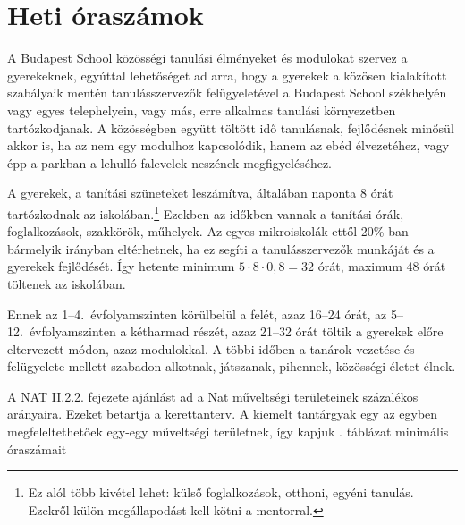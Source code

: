 \section{Heti óraszámok}

A Budapest School közösségi tanulási élményeket és modulokat szervez a gyerekeknek, egyúttal lehetőséget ad arra, hogy a gyerekek a közösen kialakított szabályaik mentén tanulásszervezők felügyeletével a Budapest School székhelyén vagy egyes telephelyein, vagy más, erre alkalmas tanulási környezetben tartózkodjanak. A közösségben együtt töltött idő tanulásnak, fejlődésnek minősül akkor is, ha az nem egy modulhoz kapcsolódik, hanem az ebéd élvezetéhez, vagy épp a parkban a lehulló falevelek neszének megfigyeléséhez.

A gyerekek, a tanítási szüneteket leszámítva, általában naponta 8 órát tartózkodnak az iskolában.\footnote{Ez alól több kivétel lehet: külső foglalkozások, otthoni, egyéni tanulás. Ezekről külön megállapodást kell kötni a mentorral.} Ezekben az időkben vannak a tanítási órák, foglalkozások, szakkörök, műhelyek. Az egyes mikroiskolák ettől 20\%-ban bármelyik irányban eltérhetnek, ha ez segíti a tanulásszervezők munkáját és a gyerekek fejlődését. Így hetente minimum $5 \cdot 8 \cdot 0,8 = 32$ órát, maximum $48$ órát töltenek az iskolában.

Ennek az 1--4.~évfolyamszinten körülbelül a felét, azaz 16--24 órát, az 5--12.~évfolyamszinten a  kétharmad részét, azaz 21--32 órát töltik a gyerekek előre eltervezett módon, azaz modulokkal. A többi időben a tanárok vezetése és felügyelete mellett szabadon alkotnak, játszanak, pihennek, közösségi életet élnek.

A NAT II.2.2. fejezete ajánlást ad a Nat műveltségi területeinek százalékos arányaira. Ezeket betartja a kerettanterv. A kiemelt tantárgyak egy az egyben megfeleltethetőek egy-egy műveltségi területnek, így kapjuk . táblázat minimális óraszámait


